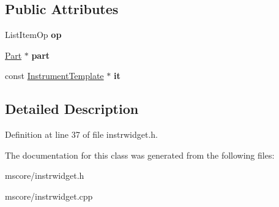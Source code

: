 \subsection*{Public Attributes}
\begin{DoxyCompactItemize}
\item 
\mbox{\label{class_ms_1_1_part_list_item_abf0e398f7f8dccc41482ddefd1b06770}} 
List\+Item\+Op {\bfseries op}
\item 
\mbox{\label{class_ms_1_1_part_list_item_a54d5b15b0832d76ea8ac6f7e22018bfb}} 
\hyperlink{class_ms_1_1_part}{Part} $\ast$ {\bfseries part}
\item 
\mbox{\label{class_ms_1_1_part_list_item_a7a98e636dd090eb2e4cd4e41d65a8e98}} 
const \hyperlink{class_ms_1_1_instrument_template}{Instrument\+Template} $\ast$ {\bfseries it}
\end{DoxyCompactItemize}


\subsection{Detailed Description}


Definition at line 37 of file instrwidget.\+h.



The documentation for this class was generated from the following files\+:\begin{DoxyCompactItemize}
\item 
mscore/instrwidget.\+h\item 
mscore/instrwidget.\+cpp\end{DoxyCompactItemize}
